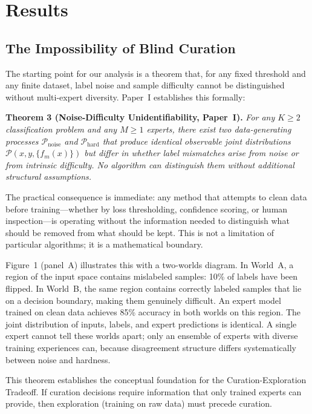 \documentclass[12pt,a4paper]{article}
\begin{document}
\section{Results}

\subsection{The Impossibility of Blind Curation}

The starting point for our analysis is a theorem that, for any fixed threshold and any finite dataset, label noise and sample difficulty cannot be distinguished without multi-expert diversity. Paper~I establishes this formally:

\noindent\textbf{Theorem 3 (Noise-Difficulty Unidentifiability, Paper~I).} \emph{For any $K \geq 2$ classification problem and any $M \geq 1$ experts, there exist two data-generating processes $\mathcal{P}_{\text{noise}}$ and $\mathcal{P}_{\text{hard}}$ that produce identical observable joint distributions $\mathcal{P}(x, y, \{f_m(x)\})$ but differ in whether label mismatches arise from noise or from intrinsic difficulty. No algorithm can distinguish them without additional structural assumptions.}

The practical consequence is immediate: any method that attempts to clean data before training---whether by loss thresholding, confidence scoring, or human inspection---is operating without the information needed to distinguish what should be removed from what should be kept. This is not a limitation of particular algorithms; it is a mathematical boundary.

Figure~1 (panel~A) illustrates this with a two-worlds diagram. In World~A, a region of the input space contains mislabeled samples: 10\% of labels have been flipped. In World~B, the same region contains correctly labeled samples that lie on a decision boundary, making them genuinely difficult. An expert model trained on clean data achieves 85\% accuracy in both worlds on this region. The joint distribution of inputs, labels, and expert predictions is identical. A single expert cannot tell these worlds apart; only an ensemble of experts with diverse training experiences can, because disagreement structure differs systematically between noise and hardness.

This theorem establishes the conceptual foundation for the Curation-Exploration Tradeoff. If curation decisions require information that only trained experts can provide, then exploration (training on raw data) must precede curation.
\end{document}
